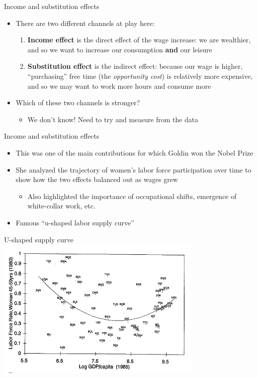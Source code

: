 \documentclass[aspectratio=169]{beamer}
\begin{document}
\begin{frame}{Income and substitution effects}
    \begin{itemize}
        \item There are two different channels at play here:
        \begin{enumerate}
            \item \textbf{Income effect} is the direct effect of the wage increase: we are wealthier, and so we want to increase our consumption \textbf{and} our leisure
            \item \textbf{Substitution effect} is the indirect effect: because our wage is higher, ``purchasing'' free time (the \textit{opportunity cost}) is relatively more expensive, and so we may want to work more hours and consume more 
        \end{enumerate}
        \item Which of these two channels is stronger?
        \begin{itemize}
            \item We don't know! Need to try and measure from the data
        \end{itemize}
    \end{itemize}
\end{frame}

\begin{frame}{Income and substitution effects}
    \begin{itemize}
        \item This was one of the main contributions for which Goldin won the Nobel Prize
        \item She analyzed the trajectory of women's labor force participation over time to show how the two effects balanced out as wages grew
        \begin{itemize}
            \item Also highlighted the importance of occupational shifts, emergence of white-collar work, etc.
        \end{itemize}
        \item Famous ``u-shaped labor supply curve''
    \end{itemize}
\end{frame}

\begin{frame}{U-shaped supply curve}
    \centering
    \includegraphics[width = 0.75\textwidth,keepaspectratio]{./figs/ushape.png}
\end{frame}
\end{document}
